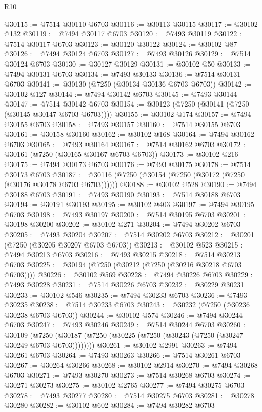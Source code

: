 \begin{lexlean}{R10}
\begin{coremodule}
@30115 := @7514 @30110 @6703
@30116 := @30113 @30115
@30117 := @30102 @132
@30119 := @7494 @30117 @6703
@30120 := @7493 @30119
@30122 := @7514 @30117 @6703
@30123 := @30120 @30122
@30124 := @30102 @87
@30126 := @7494 @30124 @6703
@30127 := @7493 @30126
@30129 := @7514 @30124 @6703
@30130 := @30127 @30129
@30131 := @30102 @50
@30133 := @7494 @30131 @6703
@30134 := @7493 @30133
@30136 := @7514 @30131 @6703
@30141 := @30130 (@7250 (@30134 @30136 @6703 @6703))
@30142 := @30102 @127
@30144 := @7494 @30142 @6703
@30145 := @7493 @30144
@30147 := @7514 @30142 @6703
@30154 := @30123 (@7250 (@30141 (@7250 (@30145 @30147 @6703 @6703))))
@30155 := @30102 @174
@30157 := @7494 @30155 @6703
@30158 := @7493 @30157
@30160 := @7514 @30155 @6703
@30161 := @30158 @30160
@30162 := @30102 @168
@30164 := @7494 @30162 @6703
@30165 := @7493 @30164
@30167 := @7514 @30162 @6703
@30172 := @30161 (@7250 (@30165 @30167 @6703 @6703))
@30173 := @30102 @216
@30175 := @7494 @30173 @6703
@30176 := @7493 @30175
@30178 := @7514 @30173 @6703
@30187 := @30116 (@7250 (@30154 (@7250 (@30172 (@7250 (@30176 @30178 @6703 @6703))))))
@30188 := @30102 @528
@30190 := @7494 @30188 @6703
@30191 := @7493 @30190
@30193 := @7514 @30188 @6703
@30194 := @30191 @30193
@30195 := @30102 @403
@30197 := @7494 @30195 @6703
@30198 := @7493 @30197
@30200 := @7514 @30195 @6703
@30201 := @30198 @30200
@30202 := @30102 @271
@30204 := @7494 @30202 @6703
@30205 := @7493 @30204
@30207 := @7514 @30202 @6703
@30212 := @30201 (@7250 (@30205 @30207 @6703 @6703))
@30213 := @30102 @523
@30215 := @7494 @30213 @6703
@30216 := @7493 @30215
@30218 := @7514 @30213 @6703
@30225 := @30194 (@7250 (@30212 (@7250 (@30216 @30218 @6703 @6703))))
@30226 := @30102 @569
@30228 := @7494 @30226 @6703
@30229 := @7493 @30228
@30231 := @7514 @30226 @6703
@30232 := @30229 @30231
@30233 := @30102 @546
@30235 := @7494 @30233 @6703
@30236 := @7493 @30235
@30238 := @7514 @30233 @6703
@30243 := @30232 (@7250 (@30236 @30238 @6703 @6703))
@30244 := @30102 @574
@30246 := @7494 @30244 @6703
@30247 := @7493 @30246
@30249 := @7514 @30244 @6703
@30260 := @30109
    (@7250 (@30187 (@7250 (@30225 (@7250 (@30243 (@7250 (@30247 @30249 @6703 @6703))))))))
@30261 := @30102 @2991
@30263 := @7494 @30261 @6703
@30264 := @7493 @30263
@30266 := @7514 @30261 @6703
@30267 := @30264 @30266
@30268 := @30102 @2914
@30270 := @7494 @30268 @6703
@30271 := @7493 @30270
@30273 := @7514 @30268 @6703
@30274 := @30271 @30273
@30275 := @30102 @2765
@30277 := @7494 @30275 @6703
@30278 := @7493 @30277
@30280 := @7514 @30275 @6703
@30281 := @30278 @30280
@30282 := @30102 @602
@30284 := @7494 @30282 @6703

\end{coremodule}
\end{lexlean}
